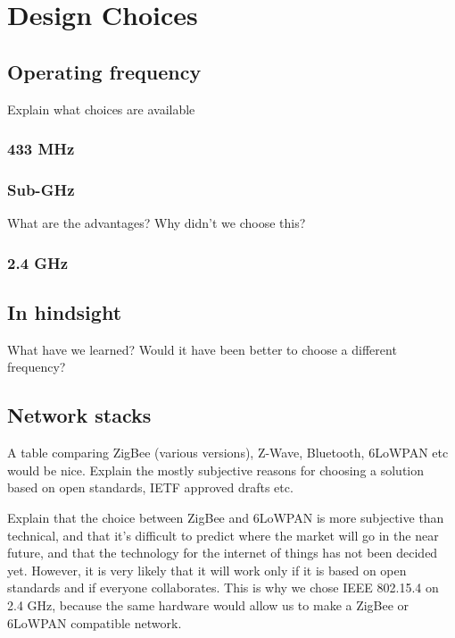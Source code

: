 \chapter{Design Choices}\label{ch:choices}

\section{Operating frequency}\label{sec:frequency}

Explain what choices are available

\subsection{433 MHz}

\subsection{Sub-GHz}

What are the advantages? Why didn't we choose this?

\subsection{2.4 GHz}

\section{In hindsight}

What have we learned? Would it have been better to choose a different frequency?

\section{Network stacks}\label{sec:stacks}

A table comparing ZigBee (various versions), Z-Wave, Bluetooth, 6LoWPAN etc
would be nice.
Explain the mostly subjective reasons for choosing a solution based on open
standards, IETF approved drafts etc. 

Explain that the choice between ZigBee and 6LoWPAN is more subjective than
technical, and that it's difficult to predict where the market will go in the
near future, and that the technology for the internet of things has not been
decided yet. However, it is very likely that it will work only if it is based on
open standards and if everyone collaborates. This is why we chose IEEE 802.15.4
on 2.4 GHz, because the same hardware would allow us to make a ZigBee or 6LoWPAN
compatible network.

